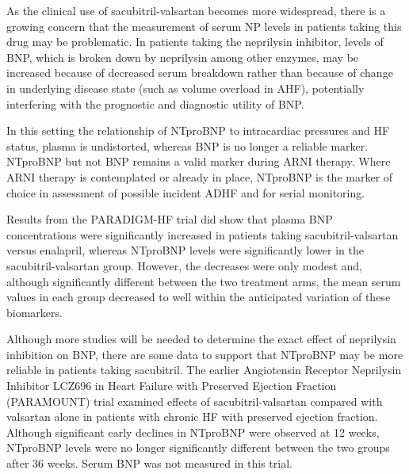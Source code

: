 \documentclass[14pt,a4paper,onecolumn]{extarticle}
\begin{document}
As the clinical use of sacubitril-valsartan becomes more widespread, there is a growing concern that the measurement of serum NP levels in patients taking this drug may be problematic. In patients taking the neprilysin inhibitor, levels of BNP, which is broken down by neprilysin among other enzymes, may be increased because of decreased serum breakdown rather than because of change in underlying disease state (such as volume overload in AHF), potentially interfering with the prognostic and diagnostic utility of BNP.  \citep{Mckie2016} %

In this setting the relationship of NTproBNP to intracardiac pressures and HF status, plasma is undistorted, whereas BNP is no longer a reliable marker. NTproBNP but not BNP remains a valid marker during ARNI therapy. Where ARNI therapy is contemplated or already in place, NTproBNP is the marker of choice in assessment of possible incident ADHF and for serial monitoring. \citep{Richards2018}

Results from the PARADIGM-HF trial did show that plasma BNP concentrations were significantly increased in patients taking sacubitril-valsartan versus enalapril, whereas NTproBNP levels were significantly lower in the sacubitril-valsartan group.  However, the decreases were only modest and, although significantly different between the two treatment arms, the mean serum values in each group decreased to well within the anticipated variation of these biomarkers. \citep{Maisel2018}

Although more studies will be needed to determine the exact effect of neprilysin inhibition on BNP, there are some data to support that NTproBNP may be more reliable in patients taking sacubitril.  The earlier Angiotensin Receptor Neprilysin Inhibitor LCZ696 in Heart Failure with Preserved Ejection Fraction (PARAMOUNT) trial examined effects of sacubitril-valsartan compared with valsartan alone in patients with chronic HF with preserved ejection fraction. Although significant early declines in NTproBNP were observed at 12 weeks, NTproBNP levels were no longer significantly different between the two groups after 36 weeks. Serum BNP was not measured in this trial.  \citep{Maisel2018}
\end{document}
